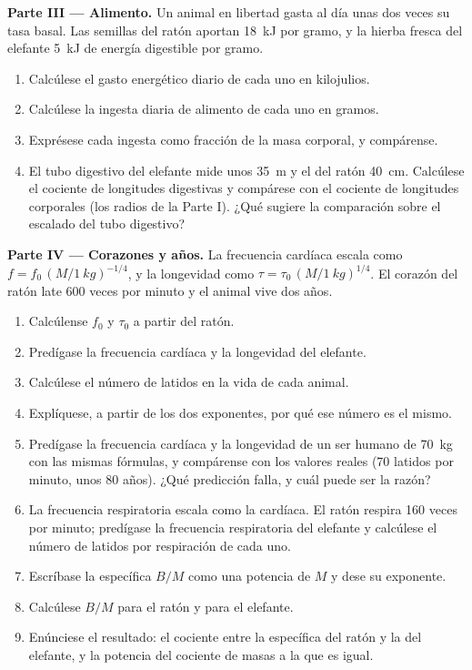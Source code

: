 \begin{problem}
\medskip
\noindent\textbf{Parte III --- Alimento.}
Un animal en libertad gasta al día unas dos veces su tasa basal. Las
semillas del ratón aportan \qty{18}{kJ} por gramo, y la hierba fresca del
elefante \qty{5}{kJ} de energía digestible por gramo.
\begin{enumerate}[resume]
  \item Calcúlese el gasto energético diario de cada uno en kilojulios.
  \item Calcúlese la ingesta diaria de alimento de cada uno en gramos.
  \item Exprésese cada ingesta como fracción de la masa corporal, y
        compárense.
  \item El tubo digestivo del elefante mide unos \qty{35}{m} y el del
        ratón \qty{40}{cm}. Calcúlese el cociente de longitudes
        digestivas y compárese con el cociente de longitudes corporales
        (los radios de la Parte I). ¿Qué sugiere la comparación sobre el
        escalado del tubo digestivo?
\end{enumerate}

\medskip
\noindent\textbf{Parte IV --- Corazones y años.}
La frecuencia cardíaca escala como $f = f_0\,(M/\qty{1}{kg})^{-1/4}$, y la
longevidad como $\tau = \tau_0\,(M/\qty{1}{kg})^{1/4}$. El corazón del ratón
late \qty{600}{} veces por minuto y el animal vive dos años.
\begin{enumerate}[resume]
  \item Calcúlense $f_0$ y $\tau_0$ a partir del ratón.
  \item Predígase la frecuencia cardíaca y la longevidad del elefante.
  \item Calcúlese el número de latidos en la vida de cada animal.
  \item Explíquese, a partir de los dos exponentes, por qué ese número es
        el mismo.
  \item Predígase la frecuencia cardíaca y la longevidad de un ser humano
        de \qty{70}{kg} con las mismas fórmulas, y compárense con los
        valores reales (\qty{70}{} latidos por minuto, unos \qty{80}{}
        años). ¿Qué predicción falla, y cuál puede ser la razón?
  \item La frecuencia respiratoria escala como la cardíaca. El ratón
        respira \qty{160}{} veces por minuto; predígase la frecuencia
        respiratoria del elefante y calcúlese el número de latidos por
        respiración de cada uno.
  \item Escríbase la  específica $B/M$ como una potencia de
        $M$ y dese su exponente.
  \item Calcúlese $B/M$ para el ratón y para el elefante.
  \item Enúnciese el resultado: el cociente entre la 
        específica del ratón y la del elefante, y la potencia del cociente
        de masas a la que es igual.
\end{enumerate}
\end{problem}
